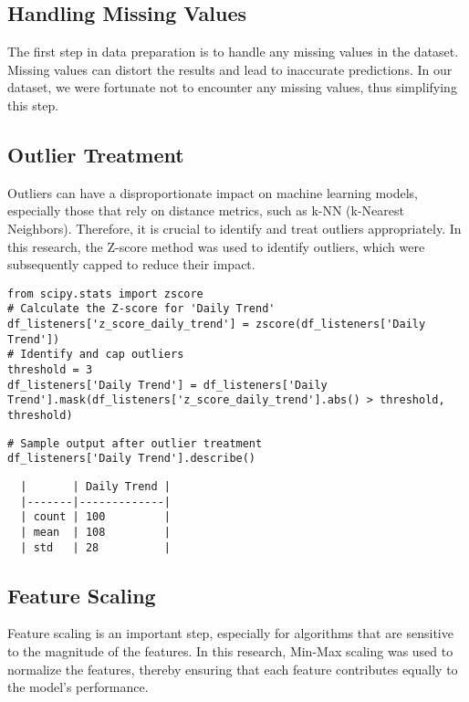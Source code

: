 \documentclass[12pt]{article}
\begin{document}
\subsection{Handling Missing Values}

The first step in data preparation is to handle any missing values in the dataset. Missing values can distort the results and lead to inaccurate predictions. In our dataset, we were fortunate not to encounter any missing values, thus simplifying this step.

\subsection{Outlier Treatment}

Outliers can have a disproportionate impact on machine learning models, especially those that rely on distance metrics, such as k-NN (k-Nearest Neighbors). Therefore, it is crucial to identify and treat outliers appropriately. In this research, the Z-score method was used to identify outliers, which were subsequently capped to reduce their impact.

\begin{lstlisting}
from scipy.stats import zscore
# Calculate the Z-score for 'Daily Trend'
df_listeners['z_score_daily_trend'] = zscore(df_listeners['Daily Trend'])
# Identify and cap outliers
threshold = 3
df_listeners['Daily Trend'] = df_listeners['Daily Trend'].mask(df_listeners['z_score_daily_trend'].abs() > threshold, threshold)
\end{lstlisting}

\begin{lstlisting}
# Sample output after outlier treatment
df_listeners['Daily Trend'].describe()
\end{lstlisting}

\begin{verbatim}
  |       | Daily Trend |
  |-------|-------------|
  | count | 100         |
  | mean  | 108         |
  | std   | 28          |
\end{verbatim}
\subsection{Feature Scaling}

Feature scaling is an important step, especially for algorithms that are sensitive to the magnitude of the features. In this research, Min-Max scaling was used to normalize the features, thereby ensuring that each feature contributes equally to the model's performance.
\end{document}
